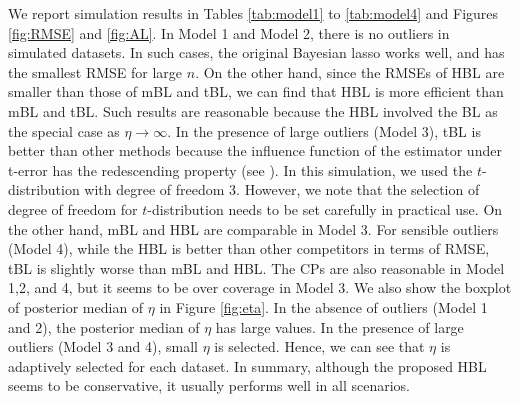 \documentclass[11pt]{article}
\theoremstyle{plain}
\theoremstyle{definition}
\begin{document}
We report simulation results in Tables \ref{tab:model1} to \ref{tab:model4} and Figures  \ref{fig:RMSE} and \ref{fig:AL}. In Model 1 and Model 2, there is no outliers in simulated datasets. In such cases, the original Bayesian lasso works well, and has the smallest RMSE  for large $n$. On the other hand, since the RMSEs of HBL are smaller than those of mBL and tBL, we can find that HBL is more efficient than mBL and tBL. Such results are reasonable because the HBL involved the BL as the special case as $\eta\to \infty$. In the presence of large outliers (Model 3), tBL is better than other methods because the influence function of the estimator under t-error has the redescending property (see \cite{HRRS11}). In this simulation, we used the $t$-distribution with degree of freedom $3$. However, we note that the selection of degree of freedom for $t$-distribution needs to be set carefully in practical use. On the other hand, mBL and HBL are comparable in Model 3. For sensible outliers (Model 4), while the HBL is better than other competitors in terms of RMSE, tBL is slightly worse than mBL and HBL. The CPs are also reasonable in Model 1,2, and 4, but it seems to be over coverage in Model 3. We also show the boxplot of posterior median of $\eta$ in Figure \ref{fig:eta}. In the absence of outliers (Model 1 and 2), the posterior median of $\eta$ has large values. In the presence of large outliers (Model 3 and 4), small $\eta$ is selected. Hence, we can see that $\eta$ is adaptively selected for each dataset. In summary, although the proposed HBL seems to be conservative, it usually performs well in all scenarios. 
\end{document}
